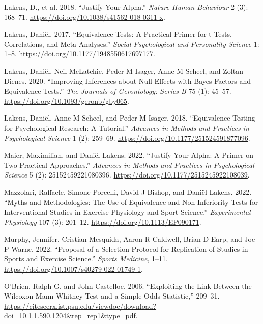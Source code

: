 \documentclass[
]{interact}
\newlength{\cslhangindent}
\newlength{\cslentryspacingunit} %
\newenvironment{CSLReferences}[2] %
 {%
  \setlength{\parindent}{0pt}
  \ifodd #1
  \let\oldpar\par
  \def\par{\hangindent=\cslhangindent\oldpar}
  \fi
  \setlength{\parskip}{#2\cslentryspacingunit}
 }%
 {}
\begin{document}
\begin{CSLReferences}{1}{0}
\leavevmode{}%
Lakens, D., et al. 2018. {``Justify Your Alpha.''} \emph{Nature Human
Behaviour} 2 (3): 168--71.
\url{https://doi.org/10.1038/s41562-018-0311-x}.

\leavevmode{}%
Lakens, Daniël. 2017. {``Equivalence Tests: A Practical Primer for
t-Tests, Correlations, and Meta-Analyses.''} \emph{Social Psychological
and Personality Science} 1: 1--8.
\url{https://doi.org/10.1177/1948550617697177}.

\leavevmode{}%
Lakens, Daniël, Neil McLatchie, Peder M Isager, Anne M Scheel, and
Zoltan Dienes. 2020. {``Improving Inferences about Null Effects with
Bayes Factors and Equivalence Tests.''} \emph{The Journals of
Gerontology: Series B} 75 (1): 45--57.
\url{https://doi.org/10.1093/geronb/gby065}.

\leavevmode{}%
Lakens, Daniël, Anne M Scheel, and Peder M Isager. 2018. {``Equivalence
Testing for Psychological Research: A Tutorial.''} \emph{Advances in
Methods and Practices in Psychological Science} 1 (2): 259--69.
\url{https://doi.org/10.1177/251524591877096}.

\leavevmode{}%
Maier, Maximilian, and Daniël Lakens. 2022. {``Justify Your Alpha: A
Primer on Two Practical Approaches.''} \emph{Advances in Methods and
Practices in Psychological Science} 5 (2): 25152459221080396.
\url{https://doi.org/10.1177/2515245922108039}.

\leavevmode{}%
Mazzolari, Raffaele, Simone Porcelli, David J Bishop, and Daniël Lakens.
2022. {``Myths and Methodologies: The Use of Equivalence and
Non-Inferiority Tests for Interventional Studies in Exercise Physiology
and Sport Science.''} \emph{Experimental Physiology} 107 (3): 201--12.
\url{https://doi.org/10.1113/EP090171}.

\leavevmode{}%
Murphy, Jennifer, Cristian Mesquida, Aaron R Caldwell, Brian D Earp, and
Joe P Warne. 2022. {``Proposal of a Selection Protocol for Replication
of Studies in Sports and Exercise Science.''} \emph{Sports Medicine},
1--11. \url{https://doi.org/10.1007/s40279-022-01749-1}.

\leavevmode{}%
O'Brien, Ralph G, and John Castelloe. 2006. {``Exploiting the Link
Between the Wilcoxon-Mann-Whitney Test and a Simple Odds Statistic,''}
209--31.
\url{https://citeseerx.ist.psu.edu/viewdoc/download?doi=10.1.1.590.1204\&rep=rep1\&type=pdf}.


\end{CSLReferences}
\end{document}
